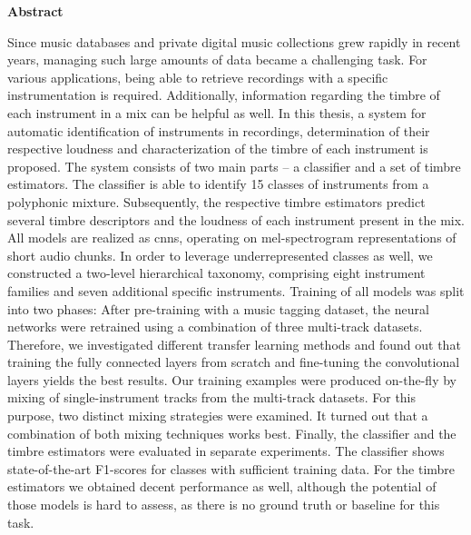 \begin{center}\Large\bfseries Abstract \end{center}\vspace*{1cm}\noindent 
Since music databases and private digital music collections grew rapidly in recent years, managing such large amounts of data became a challenging task. For various applications, being able to retrieve recordings with a specific instrumentation is required. Additionally, information regarding the timbre of each instrument in a mix can be helpful as well. In this thesis, a system for automatic identification of instruments in recordings, determination of their respective loudness and characterization of the timbre of each instrument is proposed. The system consists of two main parts -- a classifier and a set of timbre estimators. The classifier is able to identify 15 classes of instruments from a polyphonic mixture. Subsequently, the respective timbre estimators predict several timbre descriptors and the loudness of each instrument present in the mix. All models are realized as \glspl{cnn}, operating on mel-spectrogram representations of short audio chunks. In order to leverage underrepresented classes as well, we constructed a two-level hierarchical taxonomy, comprising eight instrument families and seven additional specific instruments. Training of all models was split into two phases: After pre-training with a music tagging dataset, the neural networks were retrained using a combination of three multi-track datasets. Therefore, we investigated different transfer learning methods and found out that training the fully connected layers from scratch and fine-tuning the convolutional layers yields the best results. Our training examples were produced on-the-fly by mixing of single-instrument tracks from the multi-track datasets. For this purpose, two distinct mixing strategies were examined. It turned out that a combination of both mixing techniques works best. Finally, the classifier and the timbre estimators were evaluated in separate experiments. The classifier shows state-of-the-art F1-scores for classes with sufficient training data. For the timbre estimators we obtained decent performance as well, although the potential of those models is hard to assess, as there is no ground truth or baseline for this task.